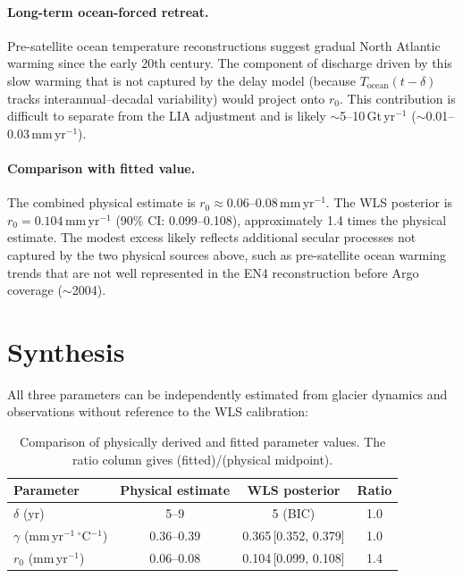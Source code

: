 \documentclass[11pt]{article}
\begin{document}
\paragraph{Long-term ocean-forced retreat.}
Pre-satellite ocean temperature reconstructions suggest gradual North Atlantic warming since the early 20th century. The component of discharge driven by this slow warming that is not captured by the delay model (because $T_{\mathrm{ocean}}(t - \delta)$ tracks interannual--decadal variability) would project onto $r_0$. This contribution is difficult to separate from the LIA adjustment and is likely $\sim$5--10\,Gt\,yr$^{-1}$ ($\sim$0.01--0.03\,mm\,yr$^{-1}$).

\paragraph{Comparison with fitted value.}
The combined physical estimate is $r_0 \approx 0.06$--$0.08$\,mm\,yr$^{-1}$. The WLS posterior is $r_0 = 0.104$\,mm\,yr$^{-1}$ (90\% CI: 0.099--0.108), approximately 1.4 times the physical estimate. The modest excess likely reflects additional secular processes not captured by the two physical sources above, such as pre-satellite ocean warming trends that are not well represented in the EN4 reconstruction before Argo coverage ($\sim$2004).

\section{Synthesis}
\label{sec:synthesis}

All three parameters can be independently estimated from glacier dynamics and observations without reference to the WLS calibration:

\begin{table}[h]
\centering
\begin{tabular}{lccc}
\toprule
Parameter & Physical estimate & WLS posterior & Ratio \\
\midrule
$\delta$ (yr) & 5--9 & 5 (BIC) & 1.0 \\
$\gamma$ (mm\,yr$^{-1}$\,$^\circ$C$^{-1}$) & 0.36--0.39 & 0.365\,[0.352, 0.379] & 1.0 \\
$r_0$ (mm\,yr$^{-1}$) & 0.06--0.08 & 0.104\,[0.099, 0.108] & 1.4 \\
\bottomrule
\end{tabular}
\caption{Comparison of physically derived and fitted parameter values. The ratio column gives (fitted)/(physical midpoint).}
\label{tab:synthesis}
\end{table}
\end{document}
